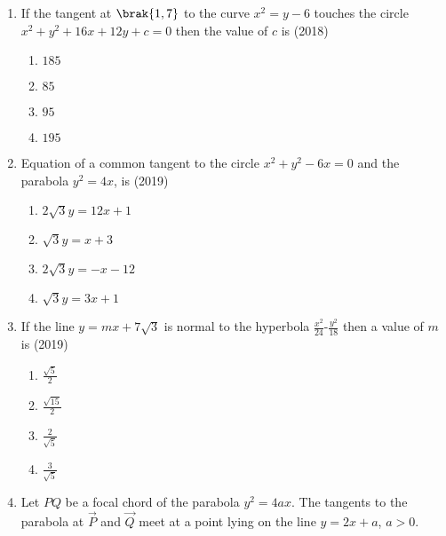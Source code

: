 \begin{enumerate}[label=\thesubsection.\arabic*.,ref=\thesubsection.\theenumi]
     \hfill{( 2018)}
	\begin{multicols}{4}
\begin{enumerate}
    		\item $2$
    		\item $3$
    		\item $\frac{4}{3}$
    		\item $\frac{1}{2}$
	\end{enumerate}
\end{multicols}
\item If the tangent at $\brak{1,7}$ to the curve $x^2=y-6$ touches the circle $x^2+y^2+16x+12y+c=0$ then the value of $c$ is 
       \hfill{(2018)}
	\begin{multicols}{4}
\begin{enumerate}
    		\item $185$
    		\item $85$
    		\item $95$
    		\item $195$
	\end{enumerate}
\end{multicols} 
\item Equation of a common tangent to the circle $x^2+y^2-6x=0$ and the parabola $y^2=4x$, is
     \hfill{(2019)}
	\begin{multicols}{2}
\begin{enumerate}
    		\item $2\sqrt{3}y=12x+1$ 
    		\item $\sqrt{3}y=x+3$
    		\item $2\sqrt{3}y=-x-12$ 
    		\item $\sqrt{3}y=3x+1$
	\end{enumerate}
\end{multicols}   
\item If the line $y=mx+7\sqrt{3}$ is normal to the hyperbola $\frac{x^2}{24}$-$\frac{y^2}{18}$ then a value of $m$ is 
     \hfill{(2019)}
	\begin{multicols}{4}
\begin{enumerate}
    		\item $\frac{\sqrt{5}}{2}$ 
    		\item $\frac{\sqrt{15}}{2}$
    		\item $\frac{2}{\sqrt5}$
    		\item $\frac{3}{\sqrt5}$
	\end{enumerate}
\end{multicols}
\item Let $PQ$ be a focal chord of the parabola $y^2=4ax$. The tangents to the parabola at $\Vec{P}$ and $\Vec{Q}$ meet at a point lying on the line $y=2x+a$, $a>0$.

\end{enumerate}
